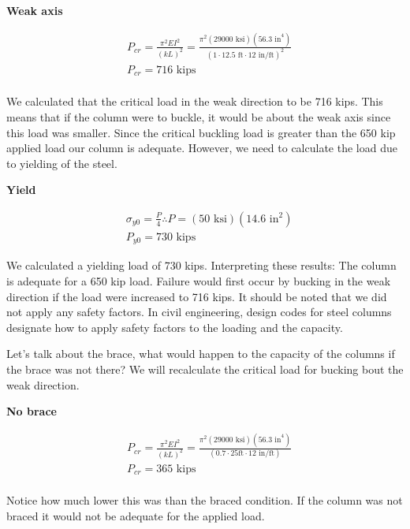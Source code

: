 \documentclass[
  letterpaper,
  DIV=11,
  numbers=noendperiod]{scrreprt}
\begin{document}
\begin{tcolorbox}
\begin{tcolorbox}
\textbf{Weak axis}

\[
\begin{aligned}
& P_{cr}=\frac{\pi^2 E I^2}{(k L)^2}=\frac{\pi^2(29000 \text{ ksi})\left(56.3{\text{ in}^4}\right)}{\left(1 \cdot 12.5 \text{ ft} \cdot 12{\text{ in/ft}}\right)^2} \\
& P_{c r}=716 \text { kips} \\
&
\end{aligned}
\]

We calculated that the critical load in the weak direction to be 716
kips. This means that if the column were to buckle, it would be about
the weak axis since this load was smaller. Since the critical buckling
load is greater than the 650 kip applied load our column is adequate.
However, we need to calculate the load due to yielding of the steel.

\textbf{Yield}

\[
\begin{aligned}
& \sigma_{y0}=\frac{P}{4} \therefore P=(50 \text{ ksi})\left(14.6 \text{ in}^2\right) \\
& P_{y0}=730 \text{ kips}
\end{aligned}
\]

We calculated a yielding load of 730 kips. Interpreting these results:
The column is adequate for a 650 kip load. Failure would first occur by
bucking in the weak direction if the load were increased to 716 kips. It
should be noted that we did not apply any safety factors. In civil
engineering, design codes for steel columns designate how to apply
safety factors to the loading and the capacity.

Let's talk about the brace, what would happen to the capacity of the
columns if the brace was not there? We will recalculate the critical
load for bucking bout the weak direction.

\textbf{No brace}

\[
\begin{aligned}
& P_{cr}=\frac{\pi^2 E I^2}{(k L)^2}=\frac{\pi^2(29000 \text{ ksi})\left(56.3{\text{ in}^4}\right)}{\left(0.7 \cdot 25 \mathrm{ft} \cdot 12{\text{ in/ft}}\right)} \\
& P_{c r}=365 \text { kips} \\
&
\end{aligned}
\]

Notice how much lower this was than the braced condition. If the column
was not braced it would not be adequate for the applied load.

\end{tcolorbox}

\end{tcolorbox}
\end{document}

